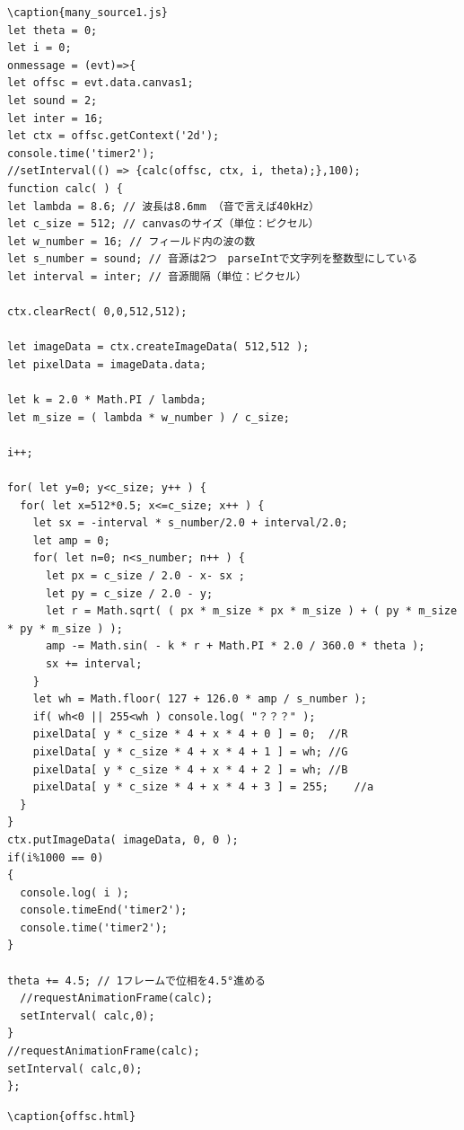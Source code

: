 \documentclass[a4j,12pt]{jsarticle}
\begin{document}
\begin{lstlisting}
\caption{many_source1.js}
let theta = 0;
let i = 0;
onmessage = (evt)=>{
let offsc = evt.data.canvas1;
let sound = 2;
let inter = 16;
let ctx = offsc.getContext('2d');
console.time('timer2');
//setInterval(() => {calc(offsc, ctx, i, theta);},100);
function calc( ) {
let lambda = 8.6; // 波長は8.6mm （音で言えば40kHz）
let c_size = 512; // canvasのサイズ（単位：ピクセル）
let w_number = 16; // フィールド内の波の数
let s_number = sound; // 音源は2つ　parseIntで文字列を整数型にしている
let interval = inter; // 音源間隔（単位：ピクセル）

ctx.clearRect( 0,0,512,512);

let imageData = ctx.createImageData( 512,512 );
let pixelData = imageData.data;

let k = 2.0 * Math.PI / lambda;
let m_size = ( lambda * w_number ) / c_size;

i++;

for( let y=0; y<c_size; y++ ) {
  for( let x=512*0.5; x<=c_size; x++ ) {
    let sx = -interval * s_number/2.0 + interval/2.0;
    let amp = 0;
    for( let n=0; n<s_number; n++ ) {
      let px = c_size / 2.0 - x- sx ;
      let py = c_size / 2.0 - y;
      let r = Math.sqrt( ( px * m_size * px * m_size ) + ( py * m_size * py * m_size ) );
      amp -= Math.sin( - k * r + Math.PI * 2.0 / 360.0 * theta );
      sx += interval;
    }
    let wh = Math.floor( 127 + 126.0 * amp / s_number );
    if( wh<0 || 255<wh ) console.log( "？？？" );
    pixelData[ y * c_size * 4 + x * 4 + 0 ] = 0;  //R
    pixelData[ y * c_size * 4 + x * 4 + 1 ] = wh; //G
    pixelData[ y * c_size * 4 + x * 4 + 2 ] = wh; //B
    pixelData[ y * c_size * 4 + x * 4 + 3 ] = 255;    //a
  }
}
ctx.putImageData( imageData, 0, 0 );
if(i%1000 == 0)
{
  console.log( i );
  console.timeEnd('timer2');
  console.time('timer2');
}

theta += 4.5; // 1フレームで位相を4.5°進める
  //requestAnimationFrame(calc);
  setInterval( calc,0);
}
//requestAnimationFrame(calc);
setInterval( calc,0);
};

\end{lstlisting}
\newpage

\begin{lstlisting}
\caption{offsc.html}
\end{lstlisting}
\newpage
\end{document}
